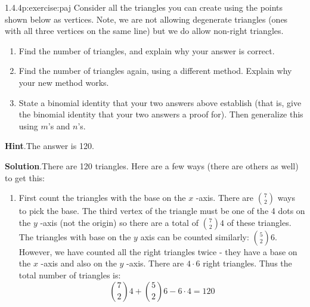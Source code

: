 \documentclass[twoside,11pt,]{book}
\newcommand{\blocktitlefont}{\relax}
\numberwithin{equation}{chapter}
\begin{document}
\begin{divisionsolution}{1.4.4}{}{p:exercise:paj}%
Consider all the triangles you can create using the points shown below as vertices. Note, we are not allowing degenerate triangles (ones with all three vertices on the same line) but we do allow non-right triangles.%
\begin{sidebyside}{1}{0.25}{0.25}{0}%
\begin{sbspanel}{0.5}%
%
\end{sbspanel}%
\end{sidebyside}%
\par
%
\begin{enumerate}[label=(\alph*)]
\item{}Find the number of triangles, and explain why your answer is correct.%
\item{}Find the number of triangles again, using a different method. Explain why your new method works.%
\item{}State a binomial identity that your two answers above establish (that is, give the binomial identity that your two answers a proof for). Then generalize this using \(m\)'s and \(n\)'s.%
\end{enumerate}
%
\par\smallskip%
\noindent\textbf{\blocktitlefont Hint}.\quad{}The answer is 120.%
\par\smallskip%
\noindent\textbf{\blocktitlefont Solution}.\quad{}There are 120 triangles. Here are a few ways (there are others as well) to get this:%
\begin{enumerate}[label=(\alph*)]
\item{}First count the triangles with the base on the \(x\) -axis. There are \({7 \choose 2}\) ways to pick the base. The third vertex of the triangle must be one of the 4 dots on the \(y\) -axis (not the origin) so there are a total of \({7 \choose 2}4\) of these triangles. The triangles with base on the \(y\) axis can be counted similarly: \({5 \choose 2}6\). However, we have counted all the right triangles twice - they have a base on the \(x\) -axis and also on the \(y\) -axis. There are \(4 \cdot 6\) right triangles. Thus the total number of triangles is:%
\begin{equation*}
{7 \choose 2}4 + {5 \choose 2}6 - 6\cdot 4 = 120

\end{equation*}
\end{enumerate}
\end{divisionsolution}
\end{document}
